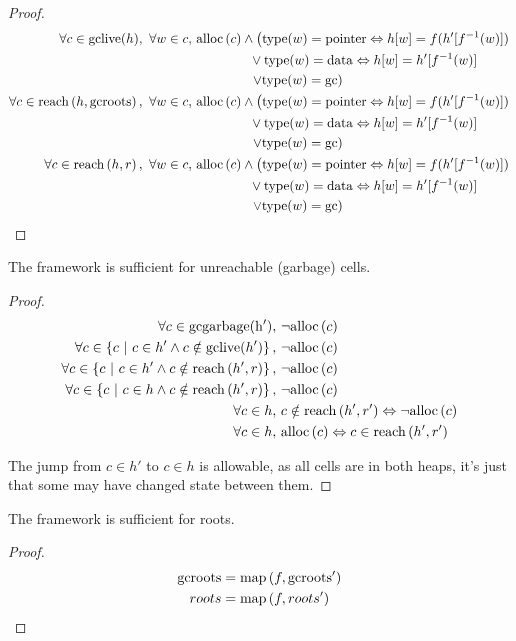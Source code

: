 \begin{proof}
  \begin{align*}
    \forall c \in \mathrm{gclive}(h),\ \forall w \in c,\ & \alloc{c}
      \land \left(\mathrm{type}(w) = \mathrm{pointer} \iff h[w] =
      f(h'[f^{-1}(w)])\right.\\
    &\quad\quad\quad\quad \lor \mathrm{type}(w) = \mathrm{data}
    \iff h[w] = h'[f^{-1}(w)]\\
    &\quad\quad\quad\quad \left.\lor \mathrm{type}(w) =
      \mathrm{gc}\right)\\
%
    \forall c \in \reach{h}{\mathrm{gcroots}},\ \forall w \in c,\ &
      \alloc{c} \land \left(\mathrm{type}(w) = \mathrm{pointer} \iff
      h[w] = f(h'[f^{-1}(w)])\right.\\
    &\quad\quad\quad\quad \lor \mathrm{type}(w) = \mathrm{data}
      \iff h[w] = h'[f^{-1}(w)]\\
    &\quad\quad\quad\quad \left.\lor \mathrm{type}(w) =
      \mathrm{gc}\right)\\
%
    \forall c \in \reach{h}{r},\ \forall w \in c,\ & \alloc{c} \land
      \left(\mathrm{type}(w) = \mathrm{pointer} \iff
      h[w] = f(h'[f^{-1}(w)])\right.\\
    &\quad\quad\quad\quad \lor \mathrm{type}(w) = \mathrm{data}
      \iff h[w] = h'[f^{-1}(w)]\\
    &\quad\quad\quad\quad \left.\lor \mathrm{type}(w) =
      \mathrm{gc}\right)
\end{align*}
\end{proof}

\begin{lemma}
  The framework is sufficient for unreachable (garbage) cells.
\end{lemma}

\begin{proof}
  \begin{align*}
    \forall c \in \mathrm{gcgarbage(h')},\ & \lnot \mathrm{alloc}\left(c\right)\\
    \forall c \in \left\{c~|~c \in h' \land c \notin
      \mathrm{gclive}(h')\right\},\ & \lnot \mathrm{alloc}\left(c\right)\\
    \forall c \in \left\{c~|~c \in h' \land c \notin
      \mathrm{reach}\left(h', r\right)\right\},\ & \lnot \mathrm{alloc}\left(c\right)\\
    \forall c \in \left\{c~|~c \in h \land c \notin
      \mathrm{reach}\left(h', r\right)\right\},\ & \lnot \mathrm{alloc}\left(c\right)\\
    \forall c \in h,\ & c \notin \mathrm{reach}\left(h', r'\right) \Leftrightarrow \lnot \mathrm{alloc}\left(c\right)\\
    \forall c \in h,\ & \mathrm{alloc}\left(c\right) \Leftrightarrow c \in \mathrm{reach}\left(h', r'\right)
  \end{align*}

  The jump from $c \in h'$ to $c \in h$ is allowable, as all cells are
  in both heaps, it's just that some may have changed state between
  them.
\end{proof}

\begin{lemma}[Roots]
  The framework is sufficient for roots.
\end{lemma}

\begin{proof}
  \begin{align*}
    \mathrm{gcroots} &= \mathrm{map}\left(f, \mathrm{gcroots'}\right)\\
    roots &= \mathrm{map}\left(f, roots'\right)
  \end{align*}
\end{proof}
